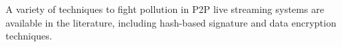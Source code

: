 
\label{sec:CIS}

A variety of techniques to fight pollution in P2P live streaming
systems are available in the literature, including hash-based
signature and data encryption techniques.

